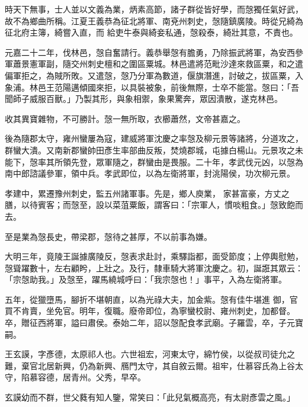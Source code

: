 \begin{pinyinscope}
 時天下無事，士人並以文義為業，炳素高節，諸子群從皆好學，而愨獨任氣好武，故不為鄉曲所稱。江夏王義恭為征北將軍、南兗州刺史，愨隨鎮廣陵。時從兄綺為征北府主簿，綺嘗入直，而
 給吏牛泰與綺妾私通，愨殺泰，綺壯其意，不責也。



 元嘉二十二年，伐林邑，愨自奮請行。義恭舉愨有膽勇，乃除振武將軍，為安西參軍蕭景憲軍副，隨交州刺史檀和之圍區粟城。林邑遣將范毗沙達來救區粟，和之遣偏軍拒之，為賊所敗。又遣愨，愨乃分軍為數道，偃旗潛進，討破之，拔區粟，入象浦。林邑王范陽邁傾國來拒，以具裝被象，前後無際，士卒不能當。愨曰：「吾聞師子威服百獸。」乃製其形，與象相禦，象果驚奔，眾因潰散，遂克林邑。



 收其異寶雜物，不可勝計。愨一無所取，衣櫛蕭然，文帝甚嘉之。



 後為隨郡太守，雍州蠻屢為寇，建威將軍沈慶之率愨及柳元景等諸將，分道攻之，群蠻大潰。又南新郡蠻帥田彥生率部曲反叛，焚燒郡城，屯據白楊山。元景攻之未能下，愨率其所領先登，眾軍隨之，群蠻由是畏服。二十年，孝武伐元凶，以愨為南中郎諮議參軍，領中兵。孝武即位，以為左衛將軍，封洮陽侯，功次柳元景。



 孝建中，累遷豫州刺史，監五州諸軍事。先是，鄉人庾業，
 家甚富豪，方丈之膳，以待賓客；而愨至，設以菜菹粟飯，謂客曰：「宗軍人，慣啖粗食。」愨致飽而去。



 至是業為愨長史，帶梁郡，愨待之甚厚，不以前事為嫌。



 大明三年，竟陵王誕據廣陵反，愨表求赴討，乘驛詣都，面受節度；上停輿慰勉，愨聳躍數十，左右顧盻，上壯之。及行，隸車騎大將軍沈慶之。初，誕誑其眾云：「宗愨助我。」及愨至，躍馬繞城呼曰：「我宗愨也！」事平，入為左衛將軍。



 五年，從獵墮馬，腳折不堪朝直，以為光祿大夫，加金紫。愨有佳牛堪進
 御，官買不肯賣，坐免官。明年，復職。廢帝即位，為寧蠻校尉、雍州刺史，加都督。卒，贈征西將軍，謚曰肅侯。泰始二年，詔以愨配食孝武廟。子羅雲，卒，子元寶嗣。



 王玄謨，字彥德，太原祁人也。六世祖宏，河東太守，綿竹侯，以從叔司徒允之難，棄官北居新興，仍為新興、鴈門太守，其自敘云爾。祖牢，仕慕容氏為上谷太守，陷慕容德，居青州。父秀，早卒。



 玄謨幼而不群，世父蕤有知人鑒，常笑曰：「此兒氣概高亮，有太尉彥雲之風。」




\end{pinyinscope}
